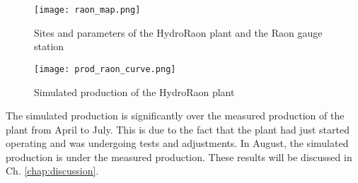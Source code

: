 \begin{figure}[H]
\centering
\texttt{[image: raon\_map.png]}
\caption{Sites and parameters of the HydroRaon plant and the Raon gauge station}
\label{raon_map}
\end{figure}

\begin{figure}[H]
\centering
\texttt{[image: prod\_raon\_curve.png]}
\caption{Simulated production of the HydroRaon plant}
\label{prod_raon_curve}
\end{figure}

The simulated production is significantly over the measured production of the plant from April to July. This is due to the fact that the plant had just started operating and was undergoing tests and adjustments. In August, the simulated production is under the measured production. These results will be discussed in Ch. \ref{chap:discussion}.

